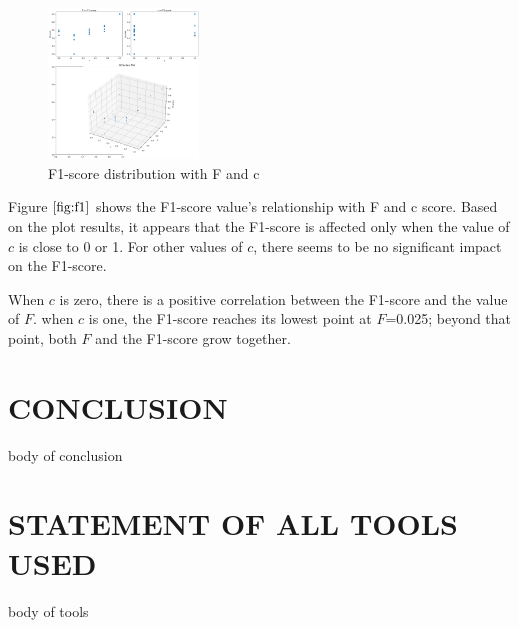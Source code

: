 \documentclass{article}
\begin{document}
  \begin{figure}[htb]

    \begin{minipage}[b]{1.0\linewidth}
      \centering
      \centerline{\includegraphics[width=4.0cm]{images/F_c_f1}}
    \end{minipage}
    \caption{F1-score distribution with F and c}
    \label{fig:f1}
    \end{figure}


Figure $\ref{fig:f1}$ shows the F1-score value's relationship with F and c score.
Based on the plot results, it appears that the F1-score is affected only when the value of $c$ is close to 0 or 1. For other values of $c$, there seems to be no significant impact on the F1-score.

When $c$ is zero, there is a positive correlation between the F1-score and the value of $F$.
when $c$ is one, the F1-score reaches its lowest point at 
$F$=0.025; beyond that point, both $F$ and the F1-score grow together.

\section{CONCLUSION}
\label{sec:conclusion}

body of conclusion

\section{STATEMENT OF ALL TOOLS USED}
\label{sec:statementofalltoolsused}

body of tools




\vfill\pagebreak



\end{document}
